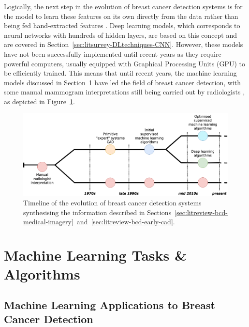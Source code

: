 Logically, the next step in the evolution of breast cancer detection systems is for the model to learn these features on its own directly from the data rather than being fed hand-extracted features \citep{Yala2019}. Deep learning models, which corresponds to neural networks with hundreds of hidden layers, are based on this concept and are covered in Section~\ref{sec:litsurvey-DLtechniques-CNN}. However, these models have not been successfully implemented until recent years as they require powerful computers, usually equipped with Graphical Processing Units (GPU) to be efficiently trained. This means that until recent years, the machine learning models discussed in Section~\ref{sec:litreview-MLmodel-BCDapplications} have led the field of breast cancer detection, with some manual mammogram interpretations still being carried out by radiologists \citep{Litjens2017}, as depicted in Figure~\ref{fig:litsurvey-bcd-timeline}.

\begin{figure}[ht]
\centerline{\includegraphics[width=\textwidth]{figures/litsurvey/bcd_timeline.png}}
\caption{\label{fig:litsurvey-bcd-timeline}Timeline of the evolution of breast cancer detection systems synthesising the information described in Sections~\ref{sec:litreview-bcd-medical-imagery}~and~\ref{sec:litreview-bcd-early-cad}.}
\end{figure}


\section{Machine Learning Tasks \& Algorithms}
\label{sec:litreview-MLmodel-BCDapplications}

\subsection{Machine Learning Applications to Breast Cancer Detection}

